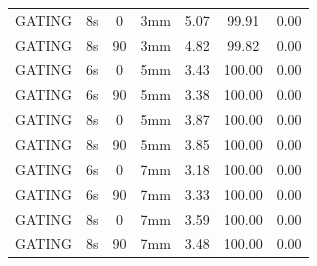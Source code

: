 \documentclass[type=dr, dr=rernat, accentcolor=tud7b,colorbacktitle, bigchapter, openright, twoside, 12pt ]{tudthesis}
\begin{document}
\begin{table}[H]
\begin{tabular}{|c||c|c|c||c|c|c|}
GATING & 8s & 0 & 3mm & 5.07 & 99.91 & 0.00 \\
GATING & 8s & 90 & 3mm & 4.82 & 99.82 & 0.00 \\
GATING & 6s & 0 & 5mm & 3.43 & 100.00 & 0.00 \\
GATING & 6s & 90 & 5mm & 3.38 & 100.00 & 0.00 \\
GATING & 8s & 0 & 5mm & 3.87 & 100.00 & 0.00 \\
GATING & 8s & 90 & 5mm & 3.85 & 100.00 & 0.00 \\
GATING & 6s & 0 & 7mm & 3.18 & 100.00 & 0.00 \\
GATING & 6s & 90 & 7mm & 3.33 & 100.00 & 0.00 \\
GATING & 8s & 0 & 7mm & 3.59 & 100.00 & 0.00 \\
GATING & 8s & 90 & 7mm & 3.48 & 100.00 & 0.00 \\
    \hline\hline 
  \end{tabular}
  \label{tab:Pat09:RPV}
\end{table}

\newpage
\end{document}
